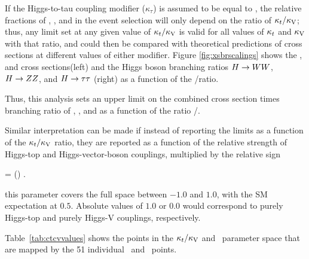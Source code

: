 If the Higgs-to-tau coupling modifier ($\kappa_\tau$) is assumed to be equal to \Ct, the relative fractions of \WW, \ZZ, and \tautau in the event selection will only depend on the ratio of $\kappa_t/\kappa_\text{V}$; thus, any limit set at any given value of $\kappa_t/\kappa_\text{V}$ is valid for all values of $\kappa_t$ and $\kappa_\text{V}$ with that ratio, and could then be compared with theoretical predictions of cross sections at different values of either modifier. Figure \ref{fig:xsbrscalings} shows the \tHq, \tHW and \ttH cross sections(left) and the Higgs boson branching ratios $ H\to WW$, $H\to ZZ$, and $H\to\tau\tau$ (right) as a function of the \Ct/\CV ratio. 

Thus, this analysis sets an upper limit on the combined cross section times branching ratio of \tHq, \tHW, and \ttH as a function of the ratio \Ct/\CV.

Similar interpretation can be made if instead of reporting the limits as a function of the $\kappa_t/\kappa_\text{V}$ ratio, they are reported as a function of the relative strength of Higgs-top and Higgs-vector-boson couplings, multiplied by the relative sign

\beqn
\ft = \left(\frac{\Ct}{\CV}\right) \times {}.
\label{eq:ft}
\eeqn

\noindent this parameter covers the full space between $-1.0$ and $1.0$, with the SM expectation at $0.5$. Absolute values of $1.0$ or $0.0$ would correspond to purely Higgs-top and purely Higgs-V couplings, respectively.

Table~\ref{tab:ctcvvalues} shows the points in the $\kappa_t/\kappa_\text{V}$ and \ft\ parameter space that are mapped by the 51 individual \Ct\ and \CV\ points.

